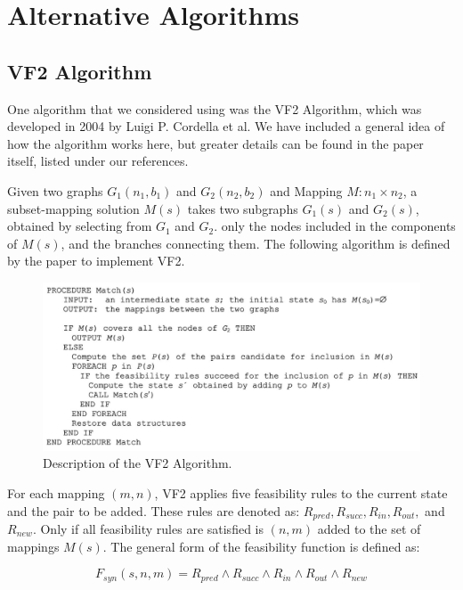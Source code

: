 \documentclass{article}
\begin{document}
\section{Alternative Algorithms}

  \subsection{VF2 Algorithm}

  One algorithm that we considered using was the VF2 Algorithm, which was developed in 2004 by Luigi P. Cordella et al. We have included a general idea of how the algorithm works here, but greater details can be found in the paper itself, listed under our references.

  Given two graphs $G_1(n_1,b_1)$ and $G_2(n_2,b_2)$ and Mapping $M : n_1 \times n_2$, a subset-mapping solution $M(s)$ takes two subgraphs $G_1(s)$ and $G_2(s)$, obtained by selecting from $G_1$ and $G_2$. only the nodes included in the components of $M(s)$, and the branches connecting them.
  The following algorithm is defined by the paper to implement VF2.

  \begin{figure}[H]
    \centering
    \includegraphics[scale=0.7]{images/vf2_rules.png}
    \caption{Description of the VF2 Algorithm.}
    \label{fig:vf2algo}
  \end{figure}

  For each mapping $(m,n)$, VF2 applies five feasibility rules to the current state and the pair to be added. These rules are denoted as: $R_{pred}, R_{succ}, R_{in}, R_{out},$ and $R_{new}$. Only if all feasibility rules are satisfied is $(n,m)$ added to the set of mappings $M(s)$. The general form of the feasibility function is defined as:

  \[ F_{syn}(s,n,m) = R_{pred} \land R_{succ} \land R_{in} \land R_{out} \land R_{new} \]
\end{document}
